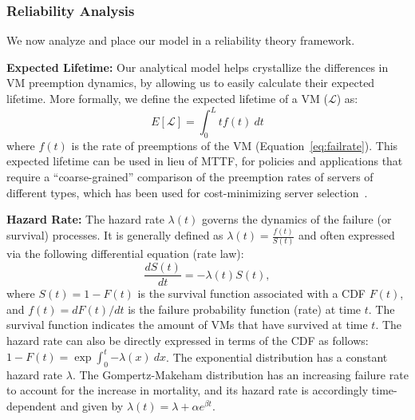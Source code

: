 
\subsubsection{Reliability Analysis}
\label{subsec:reliability}

We now analyze and place our model in a reliability theory framework. 
%

\noindent \textbf{Expected Lifetime:} Our analytical model helps crystallize the differences in VM preemption dynamics, by allowing us to easily calculate their expected lifetime. 
More formally, we define the expected lifetime of a VM ($\mathscr{L}$) as: 
\begin{equation}
  \label{eq:expected-lifetime}
E[\mathscr{L}] =  \int_{0}^{L} t {f}(t)~dt 
\end{equation}
where $f(t)$ is the rate of preemptions of the VM (Equation~\ref{eq:failrate}).
%
%
This expected lifetime can be used in lieu of MTTF, for policies and applications that require a ``coarse-grained'' comparison of the preemption rates of servers of different types, which has been used for cost-minimizing server selection~\cite{flint}. 


\noindent \textbf{Hazard Rate:}
The hazard rate $\lambda(t)$ governs the dynamics of the failure (or survival) processes. It is generally defined as $\lambda(t) = \frac{f(t)}{S(t)}$ and often expressed via the following differential equation (rate law):
\begin{equation}\label{eq:hazard}
\frac{dS(t)}{dt} = -\lambda(t) S(t),
\end{equation}
where $S(t) = 1 - F(t)$ is the survival function associated with a CDF $F(t)$, and $f(t)=dF(t)/dt$ is the failure probability function (rate) at time $t$. The survival function indicates the amount of VMs that have survived at time $t$.
The hazard rate can also be directly expressed in terms of the CDF as follows: $1-F(t) = \exp{\int_0^t{-\lambda(x) ~dx}}$. 
The exponential distribution has a constant hazard rate $\lambda$.
The Gompertz-Makeham distribution has an increasing failure rate to account for the increase in mortality, and its hazard rate is accordingly time-dependent and given by $\lambda(t) = \lambda + \alpha e^{\beta t}$.

